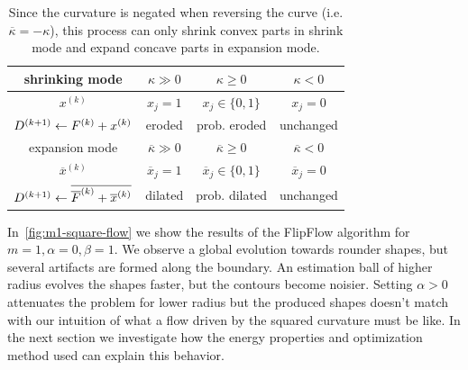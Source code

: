 \begin{table}
  \center
  \setlength{\extrarowheight}{0.75em}
  \begin{tabular}{|c|c|c|c|} \hline
    shrinking mode &    $\kappa \gg 0$ & $\kappa \geq 0$ &  $\kappa < 0$ \\ \hline
    $x^{(k)}$ & $x_j=1$ & $x_j \in \{0,1\}$ & $x_j=0$ \\ \hline
    $D^{(k+1)} \leftarrow F^{(k)} + x^{(k)}$ & eroded & prob. eroded & unchanged  \\ \hline \hline
    expansion mode &    $\overline{\kappa} \gg 0$ & $\overline{\kappa} \geq 0$ & $\overline{\kappa} < 0$ \\ \hline
    $\overline{x}^{(k)}$ & $\overline{x}_j=1$ & $\overline{x}_j \in \{0,1\}$ & $\overline{x}_j=0$ \\ \hline
    $D^{(k+1)} \leftarrow \overline{\overline{F}^{(k)} + \overline{x}^{(k)}}$ & dilated & prob. dilated & unchanged \\ \hline 
  \end{tabular}
  
  \caption{  Since the curvature is negated when reversing the curve (i.e. $\overline{\kappa}=-\kappa$), this process can only shrink  convex parts in shrink mode and expand concave parts in expansion mode.}
   \label{tab:flow-summary}	  

\end{table}


In~\cref{fig:m1-square-flow} we show the results of the FlipFlow algorithm for $m=1,\alpha=0, \beta=1$. We observe a global evolution towards rounder shapes, but several artifacts are formed along the boundary. An estimation ball of higher radius evolves the shapes faster, but the contours become noisier. Setting $\alpha >0$ attenuates the problem for lower radius but the produced shapes doesn't match with our intuition of what a flow driven by the squared curvature must be like. In the next section we investigate how the energy properties and optimization method used can explain this behavior.

